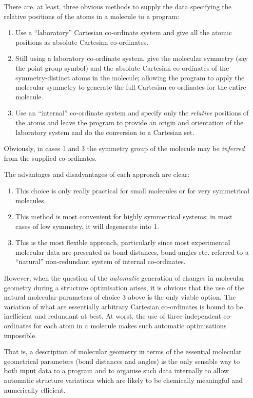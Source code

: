There are, at least, three obvious methods to supply the
data specifying the relative positions of the atoms in a
molecule to a program:
\begin{enumerate}
\item Use a ``laboratory'' Cartesian co-ordinate
system and give all the atomic positions as absolute
Cartesian co-ordinates.
\item Still using a laboratory co-ordinate system, give the
molecular symmetry (say the point group symbol) and the absolute
Cartesian co-ordinates of the symmetry-distinct atoms in the molecule;
allowing the program to apply the molecular symmetry to generate the
full Cartesian co-ordinates for the entire molecule.
\item Use an ``internal'' co-ordinate system and specify
only the {\em relative} positions of the atoms and leave the program
to provide an origin and orientation of the laboratory system and do the
conversion to a Cartesian set.
\end{enumerate}
Obviously, in cases 1 and 3 the symmetry group of the molecule
may be {\em inferred} from the supplied co-ordinates.

The advantages and disadvantages of each approach are clear:
\begin{enumerate}
\item This choice is only really practical for small molecules or
for very symmetrical molecules.
\item This method is most convenient for highly symmetrical systems;
in most cases of low symmetry, it will degenerate into 1.
\item This is the most flexible approach, particularly since most
experimental molecular data are presented as bond distances, bond
angles etc. referred to a ``natural'' non-redundant
system of internal co-ordinates.
\end{enumerate}
However, when the question of the {\em automatic} generation
of changes in molecular geometry during a structure optimisation arises,
it is obvious that the use of the natural molecular parameters
of choice 3 above is the only viable option. The variation of
what are essentially arbitrary Cartesian co-ordinates is bound to be
inefficient and redundant at best. At worst, the use of three independent
co-ordinates for each atom in a molecule makes such automatic 
optimisations impossible.

That is, a description of molecular geometry in terms of the
essential molecular geometrical parameters (bond distances and angles)
is the only sensible way to both input data to a program and to
organise such data internally to allow automatic structure variations
which are likely to be chemically meaningful and numerically
efficient.

